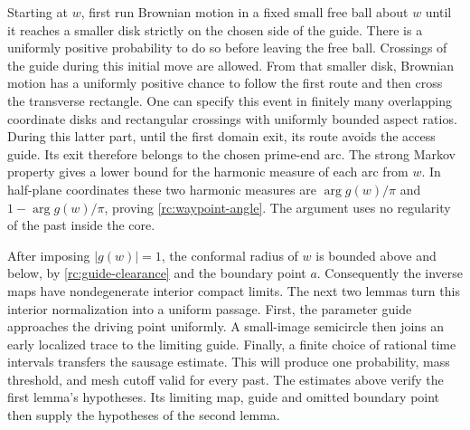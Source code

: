 \documentclass[11pt]{article}
\theoremstyle{definition}
\theoremstyle{remark}
\numberwithin{equation}{section}
\begin{document}
Starting at $w$, first run Brownian motion in a fixed small free ball
about $w$ until it reaches a smaller disk strictly on the chosen side of
the guide.  There is a uniformly positive probability to do so before
leaving the free ball.  Crossings of the guide during this initial move
are allowed.  From that smaller disk, Brownian motion has a uniformly
positive chance to follow the first route and then cross the transverse
rectangle.  One can specify this event in finitely many overlapping
coordinate disks and rectangular crossings with uniformly bounded aspect
ratios.  During this latter part, until the first domain exit, its route
avoids the access guide.  Its exit therefore belongs to the chosen
prime-end arc.  The strong Markov property gives a lower bound for the harmonic
measure of each arc from $w$.  In half-plane coordinates these two
harmonic measures are $\arg g(w)/\pi$ and $1-\arg g(w)/\pi$, proving
\eqref{rc:waypoint-angle}.  The argument uses no regularity of the past
inside the core.

After imposing $|g(w)|=1$, the conformal radius of $w$ is bounded above
and below, by \eqref{rc:guide-clearance} and the boundary point $a$.
Consequently the inverse maps have nondegenerate interior compact
limits.  The next two lemmas turn this interior normalization into a uniform
passage. First, the parameter guide approaches the driving point
uniformly. A small-image semicircle then joins an early localized trace
to the limiting guide. Finally, a finite choice of rational time
intervals transfers the sausage estimate. This will produce one
probability, mass threshold, and mesh cutoff valid for every past.
The estimates above verify the first lemma's hypotheses. Its limiting
map, guide and omitted boundary point then supply the hypotheses of
the second lemma.
\end{document}
